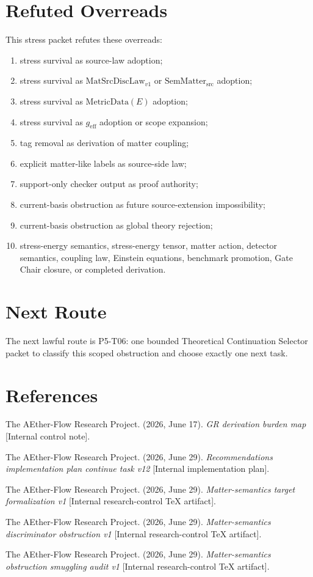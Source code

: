 \documentclass[11pt]{article}
\newcommand{\MetricData}{\mathrm{MetricData}}
\newcommand{\geff}{g_{\mathrm{eff}}}
\newcommand{\MatSrcDiscLaw}{\mathrm{MatSrcDiscLaw}_{v1}}
\newcommand{\SemMatterSrc}{\mathrm{SemMatter}_{\mathrm{src}}}
\begin{document}
\section{Refuted Overreads}

This stress packet refutes these overreads:
\begin{enumerate}[leftmargin=*]
  \item stress survival as source-law adoption;
  \item stress survival as \(\MatSrcDiscLaw\) or \(\SemMatterSrc\) adoption;
  \item stress survival as \(\MetricData(E)\) adoption;
  \item stress survival as \(\geff\) adoption or scope expansion;
  \item tag removal as derivation of matter coupling;
  \item explicit matter-like labels as source-side law;
  \item support-only checker output as proof authority;
  \item current-basis obstruction as future source-extension impossibility;
  \item current-basis obstruction as global theory rejection;
  \item stress-energy semantics, stress-energy tensor, matter action,
  detector semantics, coupling law, Einstein equations, benchmark promotion,
  Gate Chair closure, or completed derivation.
\end{enumerate}

\section{Next Route}

The next lawful route is P5-T06: one bounded Theoretical Continuation Selector
packet to classify this scoped obstruction and choose exactly one next task.

\section{References}

The AEther-Flow Research Project. (2026, June 17). \emph{GR derivation burden
map} [Internal control note].

The AEther-Flow Research Project. (2026, June 29). \emph{Recommendations
implementation plan continue task v12} [Internal implementation plan].

The AEther-Flow Research Project. (2026, June 29). \emph{Matter-semantics
target formalization v1} [Internal research-control TeX artifact].

The AEther-Flow Research Project. (2026, June 29). \emph{Matter-semantics
discriminator obstruction v1} [Internal research-control TeX artifact].

The AEther-Flow Research Project. (2026, June 29). \emph{Matter-semantics
obstruction smuggling audit v1} [Internal research-control TeX artifact].
\end{document}
